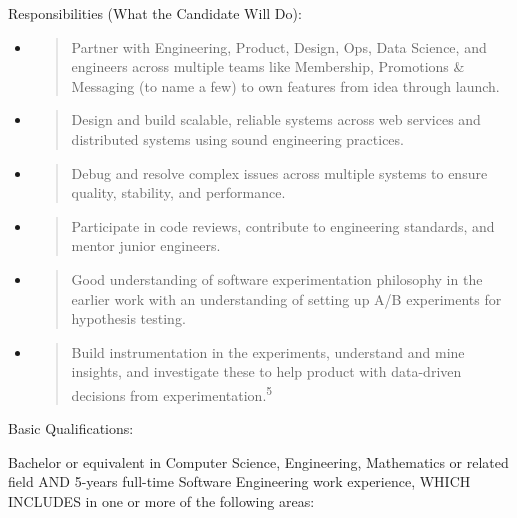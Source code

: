 \documentclass[12pt,a4paper]{article}
\begin{document}
Responsibilities (What the Candidate Will Do):

\begin{itemize}
\item
  \begin{quote}
  Partner with Engineering, Product, Design, Ops, Data Science, and engineers across multiple teams like Membership, Promotions \& Messaging (to name a few) to own features from idea through launch.
  \end{quote}
\item
  \begin{quote}
  Design and build scalable, reliable systems across web services and distributed systems using sound engineering practices.
  \end{quote}
\item
  \begin{quote}
  Debug and resolve complex issues across multiple systems to ensure quality, stability, and performance.
  \end{quote}
\item
  \begin{quote}
  Participate in code reviews, contribute to engineering standards, and mentor junior engineers.
  \end{quote}
\item
  \begin{quote}
  Good understanding of software experimentation philosophy in the earlier work with an understanding of setting up A/B experiments for hypothesis testing.
  \end{quote}
\item
  \begin{quote}
  Build instrumentation in the experiments, understand and mine insights, and investigate these to help product with data-driven decisions from experimentation.\textsuperscript{5}
  \end{quote}
\end{itemize}

Basic Qualifications:

Bachelor or equivalent in Computer Science, Engineering, Mathematics or related field AND 5-years full-time Software Engineering work experience, WHICH INCLUDES in one or more of the following areas:
\end{document}
